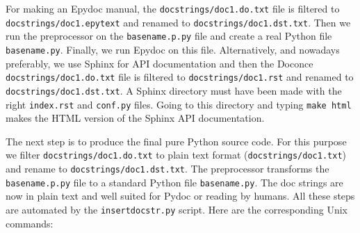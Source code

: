 \documentclass[a4paper,english]{article}
\begin{document}
For making an Epydoc manual, the \texttt{docstrings/doc1.do.txt} file is
filtered to \texttt{docstrings/doc1.epytext} and renamed to
\texttt{docstrings/doc1.dst.txt}.  Then we run the preprocessor on the
\texttt{basename.p.py} file and create a real Python file
\texttt{basename.py}. Finally, we run Epydoc on this file. Alternatively, and
nowadays preferably, we use Sphinx for API documentation and then the
Doconce \texttt{docstrings/doc1.do.txt} file is filtered to
\texttt{docstrings/doc1.rst} and renamed to \texttt{docstrings/doc1.dst.txt}. A
Sphinx directory must have been made with the right \texttt{index.rst} and
\texttt{conf.py} files. Going to this directory and typing \texttt{make html} makes
the HTML version of the Sphinx API documentation.

The next step is to produce the final pure Python source code. For
this purpose we filter \texttt{docstrings/doc1.do.txt} to plain text format
(\texttt{docstrings/doc1.txt}) and rename to \texttt{docstrings/doc1.dst.txt}. The
preprocessor transforms the \texttt{basename.p.py} file to a standard Python
file \texttt{basename.py}. The doc strings are now in plain text and well
suited for Pydoc or reading by humans. All these steps are automated
by the \texttt{insertdocstr.py} script.  Here are the corresponding Unix
commands:
%
\end{document}
